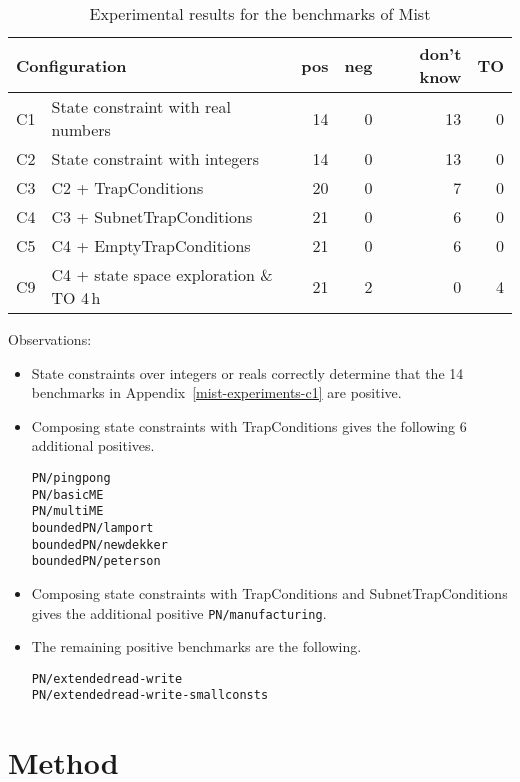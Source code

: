 \documentclass{article}
\newcommand{\mist}{{\sc Mist}}
\newcommand{\ttt}[1]{\texttt{#1}}
\begin{document}
\begin{table}[h]
\begin{center}
  \begin{tabular}{ | r | p{6cm} | r | r | r | r | }
    \hline
    \multicolumn{2}{|l|}{Configuration} & pos & neg & don't know & TO \\
    \hline
    C1 & State constraint with real numbers & 14 &  0 & 13 &  0 \\
    C2 & State constraint with integers     & 14 &  0 & 13 &  0 \\
    \hline
    C3 & C2 + TrapConditions               & 20 &  0 &  7 &  0 \\
    C4 & C3 + SubnetTrapConditions         & 21 &  0 &  6 &  0 \\
    C5 & C4 + EmptyTrapConditions          & 21 &  0 &  6 &  0 \\
    \hline
    C9 & C4 + state space exploration \& TO 4\,h & 21 &  2 & 0 &  4 \\
    \hline
  \end{tabular}
\end{center}
\caption{Experimental results for the benchmarks of \mist}
\label{mist-experiments}
\end{table}

Observations:
\begin{itemize}
\item State constraints over integers or reals correctly determine that the 14 benchmarks in Appendix~\ref{mist-experiments-c1} are positive.
\item Composing state constraints with TrapConditions gives the following 6 additional positives.
\begin{verbatim}
PN/pingpong
PN/basicME
PN/multiME
boundedPN/lamport
boundedPN/newdekker
boundedPN/peterson
\end{verbatim}
\item Composing state constraints with TrapConditions and SubnetTrapConditions gives the additional positive \ttt{PN/manufacturing}.
  \item The remaining positive benchmarks are the following.
\begin{verbatim}
PN/extendedread-write
PN/extendedread-write-smallconsts
\end{verbatim}
\end{itemize}

\newpage

\iffalse
\section{Method}
\end{document}
